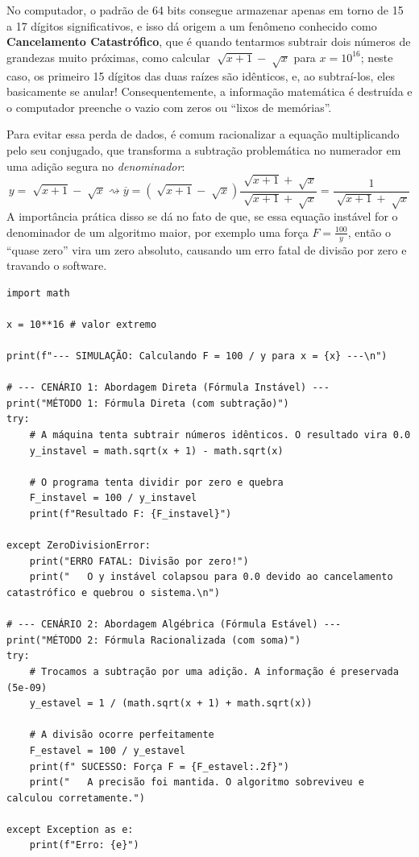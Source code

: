 \documentclass[../numerical_methods.tex]{subfiles}
\begin{document}
No computador, o padrão de 64 bits consegue armazenar apenas em torno de 15 a 17 dígitos significativos, e isso dá origem a um fenômeno conhecido como \textbf{Cancelamento Catastrófico}, que é quando tentarmos subtrair dois números de grandezas muito próximas, como calcular \(\sqrt[]{x+1} - \sqrt[]{x}\) para \(x=10^{16}\); neste caso, os primeiro 15 dígitos das duas raízes são idênticos, e, ao subtraí-los, eles basicamente se anular! Consequentemente, a informação matemática é destruída e o computador preenche o vazio com zeros ou ``lixos de memórias''.

Para evitar essa perda de dados, é comum racionalizar a equação multiplicando pelo seu conjugado, que transforma a subtração problemática no numerador em uma adição segura no \textit{denominador}:
\[
	y = \sqrt[]{x+1}-\sqrt[]{x} \rightsquigarrow \overline{y} = (\sqrt[]{x+1}-\sqrt[]{x}) \frac{\sqrt[]{x+1}+\sqrt[]{x}}{\sqrt[]{x+1}+\sqrt[]{x}} = \frac{1}{\sqrt[]{x+1}+\sqrt[]{x}}
\]
A importância prática disso se dá no fato de que, se essa equação instável for o denominador de um algoritmo maior, por exemplo uma força \(F = \frac{100}{y}\), então o ``quase zero'' vira um zero absoluto, causando um erro fatal de divisão por zero e travando o software.

\begin{listing}[H]
	\begin{verbatim}
import math

x = 10**16 # valor extremo

print(f"--- SIMULAÇÃO: Calculando F = 100 / y para x = {x} ---\n")

# --- CENÁRIO 1: Abordagem Direta (Fórmula Instável) ---
print("MÉTODO 1: Fórmula Direta (com subtração)")
try:
    # A máquina tenta subtrair números idênticos. O resultado vira 0.0
    y_instavel = math.sqrt(x + 1) - math.sqrt(x)

    # O programa tenta dividir por zero e quebra
    F_instavel = 100 / y_instavel
    print(f"Resultado F: {F_instavel}")

except ZeroDivisionError:
    print("ERRO FATAL: Divisão por zero!")
    print("   O y instável colapsou para 0.0 devido ao cancelamento catastrófico e quebrou o sistema.\n")

# --- CENÁRIO 2: Abordagem Algébrica (Fórmula Estável) ---
print("MÉTODO 2: Fórmula Racionalizada (com soma)")
try:
    # Trocamos a subtração por uma adição. A informação é preservada (5e-09)
    y_estavel = 1 / (math.sqrt(x + 1) + math.sqrt(x))

    # A divisão ocorre perfeitamente
    F_estavel = 100 / y_estavel
    print(f" SUCESSO: Força F = {F_estavel:.2f}")
    print("   A precisão foi mantida. O algoritmo sobreviveu e calculou corretamente.")

except Exception as e:
    print(f"Erro: {e}")
\end{verbatim}
\end{listing}
\end{document}
